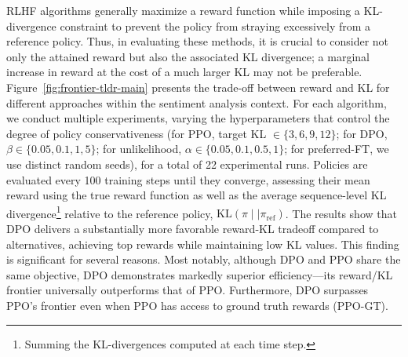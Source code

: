 RLHF algorithms generally maximize a reward function while imposing a KL-divergence constraint to prevent the policy from straying excessively from a reference policy. Thus, in evaluating these methods, it is crucial to consider not only the attained reward but also the associated KL divergence; a marginal increase in reward at the cost of a much larger KL may not be preferable. Figure~\ref{fig:frontier-tldr-main} presents the trade-off between reward and KL for different approaches within the sentiment analysis context. For each algorithm, we conduct multiple experiments, varying the hyperparameters that control the degree of policy conservativeness (for PPO, target KL $\in\{3,6,9,12\}$; for DPO, $\beta \in \{0.05,0.1,1,5\}$; for unlikelihood, $\alpha\in\{0.05,0.1,0.5,1\}$; for preferred-FT, we use distinct random seeds), for a total of 22 experimental runs. Policies are evaluated every 100 training steps until they converge, assessing their mean reward using the true reward function as well as the average sequence-level KL divergence\footnote{Summing the KL-divergences computed at each time step.} relative to the reference policy, $\text{KL}\left(\pi\mid \mid \pi_\text{ref}\right)$. The results show that DPO delivers a substantially more favorable reward-KL tradeoff compared to alternatives, achieving top rewards while maintaining low KL values. This finding is significant for several reasons. Most notably, although DPO and PPO share the same objective, DPO demonstrates markedly superior efficiency—its reward/KL frontier universally outperforms that of PPO. Furthermore, DPO surpasses PPO’s frontier even when PPO has access to ground truth rewards (PPO-GT).

